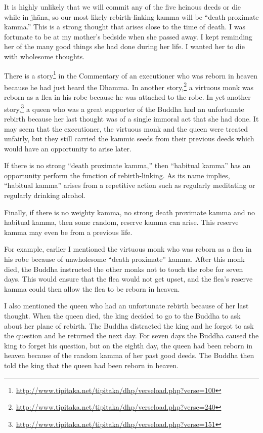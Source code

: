 It is highly unlikely that we will commit any of the five heinous deeds or die while in jhāna, so our most likely rebirth-linking kamma will be “death proximate kamma.” This is a strong thought that arises close to the time of death. I was fortunate to be at my mother’s bedside when she passed away. I kept reminding her of the many good things she had done during her life. I wanted her to die with wholesome thoughts. 

There is a story\footnote{\url{http://www.tipitaka.net/tipitaka/dhp/verseload.php?verse=100}} in the Commentary of an executioner who was reborn in heaven because he had just heard the Dhamma. In another story,\footnote{\url{http://www.tipitaka.net/tipitaka/dhp/verseload.php?verse=240}} a virtuous monk was reborn as a flea in his robe because he was attached to the robe. In yet another story,\footnote{\url{http://www.tipitaka.net/tipitaka/dhp/verseload.php?verse=151}} a queen who was a great supporter of the Buddha had an unfortunate rebirth because her last thought was of a single immoral act that she had done. It may seem that the executioner, the virtuous monk and the queen were treated unfairly, but they still carried the kammic seeds from their previous deeds which would have an opportunity to arise later.

If there is no strong “death proximate kamma,” then “habitual kamma” has an opportunity perform the function of rebirth-linking. As its name implies, “habitual kamma” arises from a repetitive action such as regularly meditating or regularly drinking alcohol.

Finally, if there is no weighty kamma, no strong death proximate kamma and no habitual kamma, then some random, reserve kamma can arise. This reserve kamma may even be from a previous life. 

For example, earlier I mentioned the virtuous monk who was reborn as a flea in his robe because of unwholesome “death proximate” kamma. After this monk died, the Buddha instructed the other monks not to touch the robe for seven days. This would ensure that the flea would not get upset, and the flea’s reserve kamma could then allow the flea to be reborn in heaven. 

I also mentioned the queen who had an unfortunate rebirth because of her last thought. When the queen died, the king decided to go to the Buddha to ask about her plane of rebirth. The Buddha distracted the king and he forgot to ask the question and he returned the next day. For seven days the Buddha caused the king to forget his question, but on the eighth day, the queen had been reborn in heaven because of the random kamma of her past good deeds. The Buddha then told the king that the queen had been reborn in heaven.

